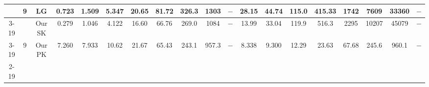 \begin{table}[]
{\begin{tabular}{|c|c|c|cccccccccccccccc|}
&\multirow{3}{*}{9}  & LG & \multicolumn{1}{c|}{0.723} & \multicolumn{1}{c|}{1.509} & \multicolumn{1}{c|}{5.347} & \multicolumn{1}{c|}{20.65} & \multicolumn{1}{c|}{81.72} & \multicolumn{1}{c|}{326.3} & \multicolumn{1}{c|}{1303} & \multicolumn{1}{c|}{$-$} & \multicolumn{1}{c|}{28.15} & \multicolumn{1}{c|}{44.74} & \multicolumn{1}{c|}{115.0} & \multicolumn{1}{c|}{415.33} & \multicolumn{1}{c|}{1742} & \multicolumn{1}{c|}{7609} & \multicolumn{1}{c|}{33360} & $-$ \\ \cline{3-19} 
 &  & Our SK & \multicolumn{1}{c|}{\cellcolor{blue!30}0.279} & \multicolumn{1}{c|}{\cellcolor{blue!30}1.046} & \multicolumn{1}{c|}{\cellcolor{blue!30}4.122} & \multicolumn{1}{c|}{\cellcolor{blue!30}16.60} & \multicolumn{1}{c|}{66.76} & \multicolumn{1}{c|}{269.0} & \multicolumn{1}{c|}{1084} & \multicolumn{1}{c|}{$-$} & \multicolumn{1}{c|}{13.99} & \multicolumn{1}{c|}{33.04} & \multicolumn{1}{c|}{119.9} & \multicolumn{1}{c|}{516.3} & \multicolumn{1}{c|}{2295} & \multicolumn{1}{c|}{10207} & \multicolumn{1}{c|}{45079} & $-$ \\ \cline{3-19} 
 & \multirow{-3}{*}{9} & Our PK & \multicolumn{1}{c|}{7.260} & \multicolumn{1}{c|}{7.933} & \multicolumn{1}{c|}{10.62} & \multicolumn{1}{c|}{21.67} & \multicolumn{1}{c|}{\cellcolor{blue!30}65.43} & \multicolumn{1}{c|}{\cellcolor{blue!30}243.1} & \multicolumn{1}{c|}{\cellcolor{blue!30}957.3} & \multicolumn{1}{c|}{$-$} & \multicolumn{1}{c|}{\cellcolor{blue!30}8.338} & \multicolumn{1}{c|}{\cellcolor{blue!30}9.300} & \multicolumn{1}{c|}{\cellcolor{blue!30}12.29} & \multicolumn{1}{c|}{\cellcolor{blue!30}23.63} & \multicolumn{1}{c|}{\cellcolor{blue!30}67.68} & \multicolumn{1}{c|}{\cellcolor{blue!30}245.6} & \multicolumn{1}{c|}{\cellcolor{blue!30}960.1} & $-$ \\ \cline{2-19} 


\end{tabular}}
\end{table}
